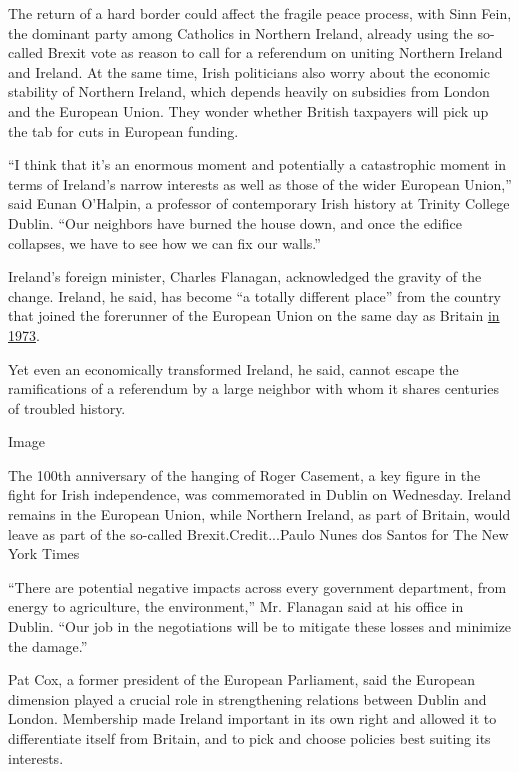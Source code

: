The return of a hard border could affect the fragile peace process, with
Sinn Fein, the dominant party among Catholics in Northern Ireland,
already using the so-called Brexit vote as reason to call for a
referendum on uniting Northern Ireland and Ireland. At the same time,
Irish politicians also worry about the economic stability of Northern
Ireland, which depends heavily on subsidies from London and the European
Union. They wonder whether British taxpayers will pick up the tab for
cuts in European funding.

``I think that it's an enormous moment and potentially a catastrophic
moment in terms of Ireland's narrow interests as well as those of the
wider European Union,'' said Eunan O'Halpin, a professor of contemporary
Irish history at Trinity College Dublin. ``Our neighbors have burned the
house down, and once the edifice collapses, we have to see how we can
fix our walls.''

Ireland's foreign minister, Charles Flanagan, acknowledged the gravity
of the change. Ireland, he said, has become ``a totally different
place'' from the country that joined the forerunner of the European
Union on the same day as Britain
\href{https://europa.eu/european-union/about-eu/history/1970-1979/1973_en}{in
1973}.

Yet even an economically transformed Ireland, he said, cannot escape the
ramifications of a referendum by a large neighbor with whom it shares
centuries of troubled history.

Image

The 100th anniversary of the hanging of Roger Casement, a key figure in
the fight for Irish independence, was commemorated in Dublin on
Wednesday. Ireland remains in the European Union, while Northern
Ireland, as part of Britain, would leave as part of the so-called
Brexit.Credit...Paulo Nunes dos Santos for The New York Times

``There are potential negative impacts across every government
department, from energy to agriculture, the environment,'' Mr. Flanagan
said at his office in Dublin. ``Our job in the negotiations will be to
mitigate these losses and minimize the damage.''

Pat Cox, a former president of the European Parliament, said the
European dimension played a crucial role in strengthening relations
between Dublin and London. Membership made Ireland important in its own
right and allowed it to differentiate itself from Britain, and to pick
and choose policies best suiting its interests.

